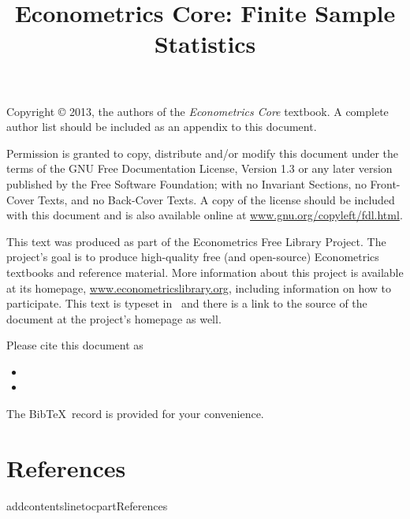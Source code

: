 \documentclass{tex/tufte-handout}
\title{Econometrics Core: Finite Sample Statistics}
\begin{document}
\maketitle

\bigskip\noindent%
Copyright © 2013, the authors of the \textit{Econometrics Core}
textbook.  A complete author list should be included as an appendix to
this document.

Permission is granted to copy, distribute and/or modify this document
under the terms of the GNU Free Documentation License, Version 1.3 or
any later version published by the Free Software Foundation; with no
Invariant Sections, no Front-Cover Texts, and no Back-Cover Texts.  A
copy of the license should be included with this document and is also
available online at \url{www.gnu.org/copyleft/fdl.html}.

This text was produced as part of the Econometrics Free Library
Project.  The project's goal is to produce high-quality free (and
open-source) Econometrics textbooks and reference material.  More
information about this project is available at its homepage,
\url{www.econometricslibrary.org}, including information on how
to participate.  This text is typeset in \XeLaTeX\ and there is a link
to the source of the document at the project's homepage as well.

Please cite this document as
\begin{itemize}
\item[] 
\item[] 
\end{itemize}
The Bib\!\TeX\ record is provided for your convenience.

\tableofcontents














\part*{References}%
addcontentsline{toc}{part}{References}

\end{document}
